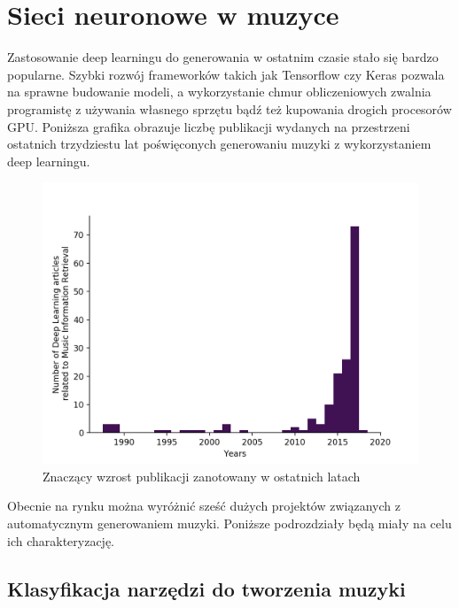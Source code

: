 	\chapter{Sieci neuronowe w muzyce}
	
		Zastosowanie deep learningu do generowania w ostatnim czasie stało się bardzo popularne. Szybki rozwój frameworków takich jak Tensorflow czy Keras pozwala na sprawne budowanie modeli, a wykorzystanie chmur obliczeniowych zwalnia programistę z używania własnego sprzętu bądź też kupowania drogich procesorów GPU. Poniższa grafika obrazuje liczbę publikacji wydanych na przestrzeni ostatnich trzydziestu lat poświęconych generowaniu muzyki z wykorzystaniem deep learningu.
	
	\begin{figure}[H]
		\centering
		\includegraphics[width=0.7\linewidth]{xxxxxxxxxx}
		\caption{Znaczący wzrost publikacji zanotowany w ostatnich latach }
		\label{fig:xxxxxxxxxx}
	\end{figure}
	
	Obecnie na rynku można wyróżnić sześć dużych projektów związanych z automatycznym generowaniem muzyki. Poniższe podrozdziały będą miały na celu ich charakteryzację. 
	\section{Klasyfikacja narzędzi do tworzenia muzyki}
	

